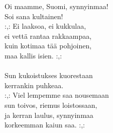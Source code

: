 
            Oi maamme, Suomi, synnyinmaa! \\
            Soi sana kultainen! \\
            :,: Ei laaksoa, ei kukkulaa, \\
            ei vettä rantaa rakkaampaa, \\
            kuin kotimaa tää pohjoinen, \\
            maa kallis isien. :,: \\
\hspace{10mm} \\
            Sun kukoistukses kuorestaan \\
            kerrankin puhkeaa. \\
            :,: Viel lempemme saa nousemaan \\
            sun toivos, riemus loistossaan, \\
            ja kerran laulus, synnyinmaa \\
            korkeemman kaiun saa. :,: \\
